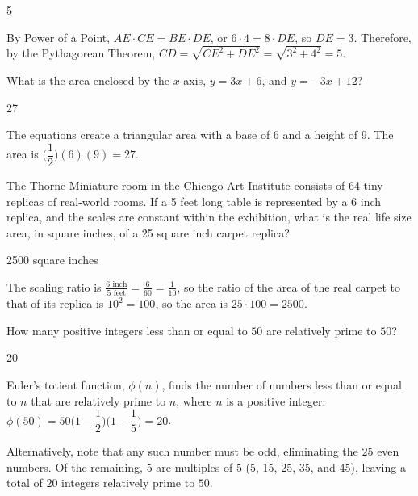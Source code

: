 \documentclass[11pt]{article}
\begin{document}
\begin{answer}
5
\end{answer}

\begin{solution}
By Power of a Point, $AE \cdot CE = BE \cdot DE$, or $6 \cdot 4 = 8 \cdot DE$, so $DE = 3$. Therefore, by the Pythagorean Theorem, $CD = \sqrt{CE^2 + DE^2} = \sqrt{3^2 + 4^2} = 5$.
\end{solution}

\begin{problem}%
What is the area enclosed by the $x$-axis, $y=3x+6$, and $y=-3x+12$?
\end{problem}

\begin{answer}
27
\end{answer}
 
\begin{solution}
The equations create a triangular area with a base of 6 and a height of 9. The area is $\bigg(\dfrac{1}{2}\bigg)(6)(9) = 27$.
\end{solution}

\begin{problem} %
The Thorne Miniature room in the Chicago Art Institute consists of 64 tiny replicas of real-world rooms. If a 5 feet long table is represented by a 6 inch replica, and the scales are constant within the exhibition, what is the real life size area, in square inches, of a 25 square inch carpet replica?
\end{problem}

\begin{answer}
2500 square inches
\end{answer}

\begin{solution}
The scaling ratio is $\frac{6 \text{ inch}}{5 \text{ feet}} = \frac{6}{60} = \frac{1}{10}$, so the ratio of the area of the real carpet to that of its replica is $10^2 = 100$, so the area is $25 \cdot 100 = 2500$.
\end{solution}


\begin{problem}%
How many positive integers less than or equal to $50$ are relatively prime to $50$?
\end{problem}

\begin{answer}
20
\end{answer}

\begin{solution}
Euler's totient function, $\phi(n)$, finds the number of numbers less than or equal to $n$ that are relatively prime to $n$, where $n$ is a positive integer. $\phi(50) = 50\bigg(1-\dfrac{1}{2}\bigg)\bigg(1-\dfrac{1}{5}\bigg) = 20$.

Alternatively, note that any such number must be odd, eliminating the $25$ even numbers. Of the remaining, $5$ are multiples of $5$ (5, 15, 25, 35, and 45), leaving a total of $20$ integers relatively prime to $50$.
\end{solution}
\end{document}
